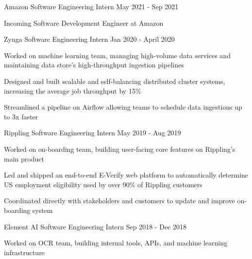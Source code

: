 \documentclass[11pt, a4paper]{awesome-cv}
\begin{document}
\makecvheader





\begin{siderules1}
\begin{cventries}
    \cventry
    {\textit{}}
    {Amazon}
    {Software Engineering Intern}
    {May 2021 - Sep 2021}
    {
      \begin{cvitems}
        \item {Incoming Software Development Engineer at Amazon}
      \end{cvitems}
    }
    \cventry
    {\textit{}}
    {Zynga}
    {Software Engineering Intern}
    {Jan 2020 - April 2020}
    {
      \begin{cvitems}
        \item {Worked on machine learning team, managing high-volume data services and maintaining data store’s high-throughput ingestion pipelines}
        \item {Designed and built scalable and self-balancing distributed cluster systems, increasing the average job throughput by 15\%}
        \item {Streamlined a pipeline on Airflow allowing teams to schedule data ingestions up to 3x faster}
      \end{cvitems}
    }
    \cventry
    {\textit{}}
    {Rippling}
    {Software Engineering Intern}
    {May 2019 - Aug 2019}
    {
      \begin{cvitems}
        \item {Worked on on-boarding team, building user-facing core features on Rippling’s main product}
        \item {Led and shipped an end-to-end E-Verify web platform to automatically determine US employment eligibility used by over 90\% of Rippling customers}
        \item {Coordinated directly with stakeholders and customers to update and improve on-boarding system}
      \end{cvitems}
    }
    \cventry
    {\textit{}}
    {Element AI}
    {Software Engineering Intern}
    {Sep 2018 - Dec 2018}
    {
      \begin{cvitems}
        \item {Worked on OCR team, building internal tools, APIs, and machine learning infrastructure}

\end{cvitems}}
\end{cventries}
\end{siderules1}
\end{document}
